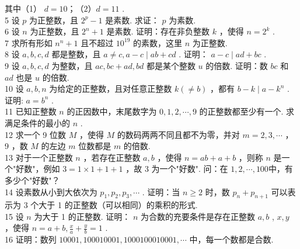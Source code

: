 其中（1） $d=10 ； （ 2 ） d=11$ . \\
5 设 $p$ 为正整数，且 $2^{p}-1$ 是素数. 求证： $p$ 为素数. \\
6 设 $n$ 为正整数，且 $2^{n}+1$ 是素数. 证明：存在非负整数 $k$ ，使得 $n=2^{k}$ . \\
7 求所有形如 $n^{n}+1$ 且不超过 $10^{19}$ 的素数，这里 $n$ 为正整数. \\
8 设 $a ,  b ,  c ,  d$ 都是整数，且 $a \neq c, a-c \mid a b+c d$ . 证明： $a-c \mid a d+b c$ . \\
9 设 $a ,  b ,  c ,  d$ 为整数，且 $a c ,  b c+a d ,  b d$ 都是某个整数 $u$ 的倍数. 证明：数 $b c$ 和 $a d$ 也是 $u$ 的倍数. \\
10 设 $a ,  b ,  n$ 为给定的正整数，且对任意正整数 $k(\neq b)$ ，都有 $b-k \mid a-k^{n}$ . 证明: $a=b^{n}$ . \\
11 已知正整数 $n$ 的正因数中，末尾数字为 $0,1,2, \cdots, 9$ 的正整数都至少有一个. 求满足条件的最小的 $n$ . \\
12 求一个 9 位数 $M$ ，使得 $M$ 的数码两两不同且都不为零，并对 $m=2,3, \cdots$ ， 9 ，数 $M$ 的左边 $m$ 位数都是 $m$ 的倍数. \\
13 对于一个正整数 $n$ ，若存在正整数 $a ,  b$ ，使得 $n=a b+a+b$ ，则称 $n$ 是一个"好数"，例如 $3=1 \times 1+1+1$ ，故 3 为一个"好数". 问：在 $1,2, \cdots, 100$中，有多少个"好数"？\\
14 设素数从小到大依次为 $p_{1}, p_{2}, p_{3}, \cdots$ . 证明：当 $n \geqslant 2$ 时，数 $p_{n}+p_{n+1}$ 可以表示为 3 个大于 1 的正整数（可以相同）的乘积的形式. \\
15 设 $n$ 为大于 1 的正整数. 证明： $n$ 为合数的充要条件是存在正整数 $a ,  b$ ,  $x ,  y$ ，使得 $n=a+b, \frac{x}{a}+\frac{y}{b}=1$ . \\
16 证明：数列 $10001,100010001,1000100010001, \cdots$ 中，每一个数都是合数.

